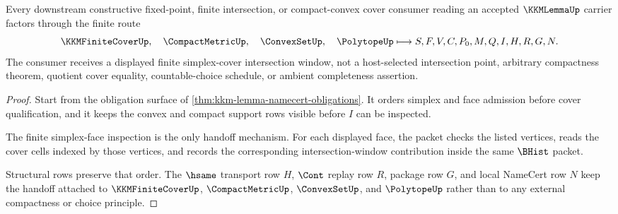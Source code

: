 \begin{theorem}
\label{thm:kkm-lemma-finite-simplex-cover-handoff}
Every downstream constructive fixed-point, finite intersection, or compact-convex cover consumer reading an accepted $\KKMLemmaUp$ carrier factors through the finite route
$$
\KKMFiniteCoverUp,\quad \CompactMetricUp,\quad \ConvexSetUp,\quad \PolytopeUp
\longmapsto
S,F,V,C,P_0,M,Q,I,H,R,G,N .
$$
The consumer receives a displayed finite simplex-cover intersection window, not a host-selected intersection point, arbitrary compactness theorem, quotient cover equality, countable-choice schedule, or ambient completeness assertion.
\end{theorem}
\begin{proof}
Start from the obligation surface of \autoref{thm:kkm-lemma-namecert-obligations}. It orders simplex and face admission before cover qualification, and it keeps the convex and compact support rows visible before $I$ can be inspected.

The finite simplex-face inspection is the only handoff mechanism. For each displayed face, the packet checks the listed vertices, reads the cover cells indexed by those vertices, and records the corresponding intersection-window contribution inside the same $\BHist$ packet.

Structural rows preserve that order. The $\hsame$ transport row $H$, $\Cont$ replay row $R$, package row $G$, and local NameCert row $N$ keep the handoff attached to $\KKMFiniteCoverUp$, $\CompactMetricUp$, $\ConvexSetUp$, and $\PolytopeUp$ rather than to any external compactness or choice principle.
\end{proof}


\begin{closurestatus}{\KKMLemmaUp}
  \theoryclosure{\seedClosure}
  \formalstatus{\unformalizedV}
\end{closurestatus}
